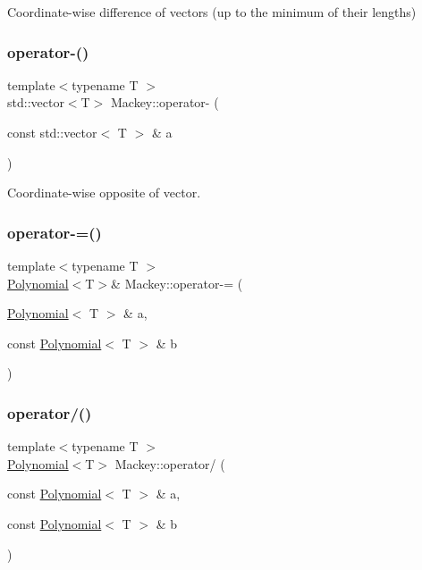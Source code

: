 Coordinate-\/wise difference of vectors (up to the minimum of their lengths) 

\mbox{\label{namespaceMackey_a9d67cfe3e93ac3ef2301547372b48e15}} 
\subsubsection{\texorpdfstring{operator-\/()}{operator-()}\hspace{0.1cm}{\footnotesize\ttfamily [4/4]}}
{\footnotesize\ttfamily template$<$typename T $>$ \\
std\+::vector$<$T$>$ Mackey\+::operator-\/ (\begin{DoxyParamCaption}\item[{const std\+::vector$<$ T $>$ \&}]{a }\end{DoxyParamCaption})}



Coordinate-\/wise opposite of vector. 

\mbox{\label{namespaceMackey_a9cb1fbb70826d41d001bef40d09d9e3f}} 
\subsubsection{\texorpdfstring{operator-\/=()}{operator-=()}}
{\footnotesize\ttfamily template$<$typename T $>$ \\
\hyperlink{classMackey_1_1Polynomial}{Polynomial}$<$T$>$\& Mackey\+::operator-\/= (\begin{DoxyParamCaption}\item[{\hyperlink{classMackey_1_1Polynomial}{Polynomial}$<$ T $>$ \&}]{a,  }\item[{const \hyperlink{classMackey_1_1Polynomial}{Polynomial}$<$ T $>$ \&}]{b }\end{DoxyParamCaption})}

\mbox{\label{namespaceMackey_ac26fb6e8a8b7350d13f866570d588e6c}} 
\subsubsection{\texorpdfstring{operator/()}{operator/()}}
{\footnotesize\ttfamily template$<$typename T $>$ \\
\hyperlink{classMackey_1_1Polynomial}{Polynomial}$<$T$>$ Mackey\+::operator/ (\begin{DoxyParamCaption}\item[{const \hyperlink{classMackey_1_1Polynomial}{Polynomial}$<$ T $>$ \&}]{a,  }\item[{const \hyperlink{classMackey_1_1Polynomial}{Polynomial}$<$ T $>$ \&}]{b }\end{DoxyParamCaption})}

